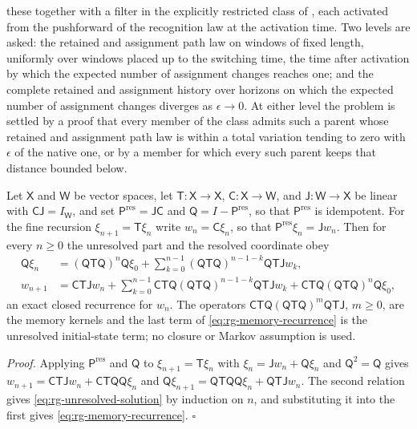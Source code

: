 these together with a filter in the explicitly restricted class of
, each activated from the pushforward of the recognition law
at the activation time. Two levels are asked: the retained and assignment path law on
windows of fixed length, uniformly over windows placed up to the switching time,
the time after activation by which the expected number of assignment changes
reaches one; and the complete retained and assignment history over horizons on
which the expected number of assignment changes diverges as $\epsilon\to0$. At
either level the problem is settled by a proof that every member of the class
admits such a parent whose retained and assignment path law is within a total
variation tending to zero with $\epsilon$ of the native one, or by a member for
which every such parent keeps that distance bounded below.

Let $\mathsf X$ and $\mathsf W$ be vector spaces, let $\mathsf T:\mathsf X\to\mathsf X$,
$\mathsf C:\mathsf X\to\mathsf W$, and $\mathsf J:\mathsf W\to\mathsf X$ be linear
with $\mathsf C\mathsf J=I_{\mathsf W}$, and set $\mathsf P^{\mathrm{res}}=\mathsf
J\mathsf C$ and $\mathsf Q=I-\mathsf P^{\mathrm{res}}$, so that $\mathsf
P^{\mathrm{res}}$ is idempotent. For the fine recursion $\xi_{n+1}=\mathsf T\xi_n$
write $w_n=\mathsf C\xi_n$, so that $\mathsf P^{\mathrm{res}}\xi_n=\mathsf Jw_n$.
Then for every $n\ge0$ the unresolved part and the resolved coordinate obey
\begin{align}
\mathsf Q\xi_n
&=(\mathsf Q\mathsf T\mathsf Q)^n\mathsf Q\xi_0
+\sum_{k=0}^{n-1}(\mathsf Q\mathsf T\mathsf Q)^{n-1-k}\mathsf Q\mathsf T\mathsf Jw_k,
\label{eq:rg-unresolved-solution}\\
w_{n+1}
&=\mathsf C\mathsf T\mathsf Jw_n
+\sum_{k=0}^{n-1}\mathsf C\mathsf T\mathsf Q(\mathsf Q\mathsf T\mathsf Q)^{n-1-k}\mathsf Q\mathsf T\mathsf Jw_k
+\mathsf C\mathsf T\mathsf Q(\mathsf Q\mathsf T\mathsf Q)^n\mathsf Q\xi_0 ,
\label{eq:rg-memory-recurrence}
\end{align}
an exact closed recurrence for $w_n$. The operators
$\mathsf C\mathsf T\mathsf Q(\mathsf Q\mathsf T\mathsf Q)^m\mathsf Q\mathsf T\mathsf
J$, $m\ge0$, are the memory kernels and the last term of
\eqref{eq:rg-memory-recurrence} is the unresolved initial-state term; no closure or
Markov assumption is used. 

\noindent\emph{Proof.}
Applying $\mathsf P^{\mathrm{res}}$ and $\mathsf Q$ to $\xi_{n+1}=\mathsf T\xi_n$ with
$\xi_n=\mathsf Jw_n+\mathsf Q\xi_n$ and $\mathsf Q^2=\mathsf Q$ gives
$w_{n+1}=\mathsf C\mathsf T\mathsf Jw_n+\mathsf C\mathsf T\mathsf Q\mathsf Q\xi_n$ and
$\mathsf Q\xi_{n+1}=\mathsf Q\mathsf T\mathsf Q\mathsf Q\xi_n+\mathsf Q\mathsf T\mathsf Jw_n$.
The second relation gives \eqref{eq:rg-unresolved-solution} by induction on $n$, and
substituting it into the first gives \eqref{eq:rg-memory-recurrence}. $\square$

